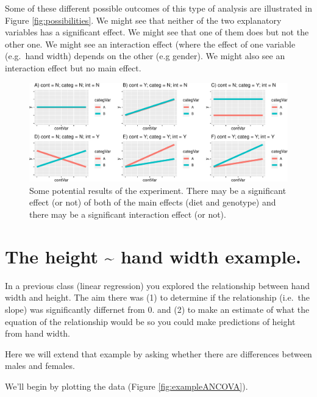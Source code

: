 \documentclass[
  a4paperpaper,
]{book}
\begin{document}
Some of these different possible outcomes of this type of analysis are illustrated in Figure \ref{fig:possibilities}. We might see that neither of the two explanatory variables has a significant effect. We might see that one of them does but not the other one. We might see an interaction effect (where the effect of one variable (e.g.~hand width) depends on the other (e.g gender). We might also see an interaction effect but no main effect.

\begin{figure}[ht]

{\centering \includegraphics{BB852_files/figure-latex/ANCOVApossibilities-1} 

}

\caption{Some potential results of the experiment. There may be a significant effect (or not) of both of the main effects (diet and genotype) and there may be a significant interaction effect (or not).}\label{fig:ANCOVApossibilities}
\end{figure}

\hypertarget{the-height-hand-width-example.}{%
\section{The height \textasciitilde{} hand width example.}\label{the-height-hand-width-example.}}

In a previous class (linear regression) you explored the relationship between hand width and height. The aim there was (1) to determine if the relationship (i.e.~the slope) was significantly differnet from 0. and (2) to make an estimate of what the equation of the relationship would be so you could make predictions of height from hand width.

Here we will extend that example by asking whether there are differences between males and females.

We'll begin by plotting the data (Figure \ref{fig:exampleANCOVA}).
\end{document}
